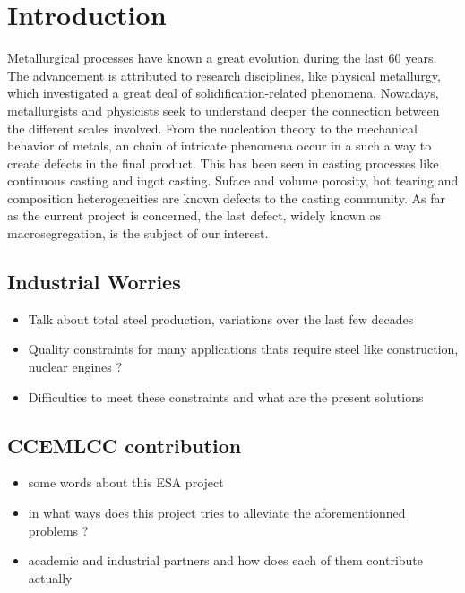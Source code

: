 \chapter*{Introduction}


Metallurgical processes have known a great evolution during the last 60 years. The advancement is attributed to 
research disciplines, like physical metallurgy, which investigated a great deal of solidification-related phenomena.
Nowadays, metallurgists and physicists seek to understand deeper the connection between the different scales involved.
From the nucleation theory to the mechanical behavior of metals, an chain of intricate phenomena occur in a such a way
to create defects in the final product. This has been seen in casting processes like continuous casting and ingot
casting. Suface and volume porosity, hot tearing and composition heterogeneities are known defects to the casting community.
As far as the current project is concerned, the last defect, widely known as macrosegregation, is the subject of our interest.

\section*{Industrial Worries}
\begin{itemize}
\item Talk about total steel production, variations over the last few decades
\item Quality constraints for many applications thats require steel like construction, nuclear engines ? 
\item Difficulties to meet these constraints and what are the present solutions
\end{itemize}


\section*{CCEMLCC contribution}
\begin{itemize}
\item some words about this ESA project
\item in what ways does this project tries to alleviate the aforementionned problems ?
\item academic and industrial partners and how does each of them contribute actually
\end{itemize}


